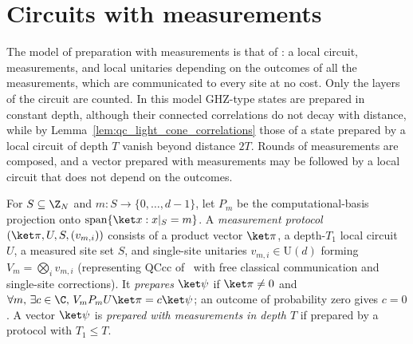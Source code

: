 
\section{Circuits with measurements}
\label{sec:qc_measurements}

The model of preparation with measurements is that of \cite{Piroli2021LOCC}:
a local circuit, measurements, and local unitaries depending on the outcomes
of all the measurements, which are communicated to every site at no cost.
Only the layers of the circuit are counted. In this model GHZ-type states are
prepared in constant depth, although their connected correlations do not
decay with distance, while by Lemma~\ref{lem:qc_light_cone_correlations} those
of a state prepared by a local circuit of depth $T$ vanish beyond distance
$2T$. Rounds of measurements are composed, and a vector prepared with
measurements may be followed by a local circuit that does not depend on the
outcomes.

\begin{definition}
    \label{def:qc_measurement_preparation}
    \leanok
    For $S\subseteq\Z_N$ and $m\colon S\to\{0,\dots,d-1\}$, let $P_m$ be the computational-basis projection onto $\operatorname{span}\{\ket x:x|_S=m\}$. A \emph{measurement protocol} $(\ket\pi,U,S,(v_{m,i}))$ consists of a product vector $\ket\pi$, a depth-$T_1$ local circuit $U$, a measured site set $S$, and single-site unitaries $v_{m,i}\in\mathrm U(d)$ forming $V_m=\bigotimes_i v_{m,i}$ (representing $\mathrm{QCcc}$ of~\cite{Piroli2021LOCC} with free classical communication and single-site corrections). It \emph{prepares} $\ket\psi$ if $\ket\pi\neq0$ and $\forall m,\,\exists c\in\C,\,V_mP_mU\ket\pi=c\ket\psi$; an outcome of probability zero gives $c=0$. A vector $\ket\psi$ is \emph{prepared with measurements in depth $T$} if prepared by a protocol with $T_1\leq T$.
\end{definition}

